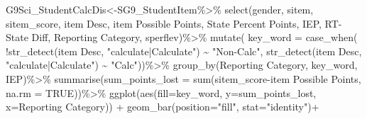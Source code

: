 \documentclass[
  letterpaper,
  DIV=11,
  numbers=noendperiod]{scrartcl}
\newenvironment{Shaded}{\begin{snugshade}}{\end{snugshade}}
\newcommand{\AttributeTok}[1]{\textcolor[rgb]{0.40,0.45,0.13}{#1}}
\newcommand{\ConstantTok}[1]{\textcolor[rgb]{0.56,0.35,0.01}{#1}}
\newcommand{\FunctionTok}[1]{\textcolor[rgb]{0.28,0.35,0.67}{#1}}
\newcommand{\NormalTok}[1]{\textcolor[rgb]{0.00,0.23,0.31}{#1}}
\newcommand{\OtherTok}[1]{\textcolor[rgb]{0.00,0.23,0.31}{#1}}
\newcommand{\SpecialCharTok}[1]{\textcolor[rgb]{0.37,0.37,0.37}{#1}}
\newcommand{\StringTok}[1]{\textcolor[rgb]{0.13,0.47,0.30}{#1}}
\begin{document}
\begin{Shaded}
\begin{Highlighting}[]
\NormalTok{G9Sci\_StudentCalcDis}\OtherTok{\textless{}{-}}\NormalTok{SG9\_StudentItem}\SpecialCharTok{\%\textgreater{}\%}
  \FunctionTok{select}\NormalTok{(gender, sitem, sitem\_score, }\StringTok{\textasciigrave{}}\AttributeTok{item Desc}\StringTok{\textasciigrave{}}\NormalTok{, }\StringTok{\textasciigrave{}}\AttributeTok{item Possible Points}\StringTok{\textasciigrave{}}\NormalTok{, }\StringTok{\textasciigrave{}}\AttributeTok{State Percent Points}\StringTok{\textasciigrave{}}\NormalTok{, IEP, }\StringTok{\textasciigrave{}}\AttributeTok{RT{-}State Diff}\StringTok{\textasciigrave{}}\NormalTok{, }\StringTok{\textasciigrave{}}\AttributeTok{Reporting Category}\StringTok{\textasciigrave{}}\NormalTok{, }\StringTok{\textasciigrave{}}\AttributeTok{sperflev}\StringTok{\textasciigrave{}}\NormalTok{)}\SpecialCharTok{\%\textgreater{}\%}
  \FunctionTok{mutate}\NormalTok{( }\AttributeTok{key\_word =} \FunctionTok{case\_when}\NormalTok{(}
     \SpecialCharTok{!}\FunctionTok{str\_detect}\NormalTok{(}\StringTok{\textasciigrave{}}\AttributeTok{item Desc}\StringTok{\textasciigrave{}}\NormalTok{, }\StringTok{"calculate|Calculate"}\NormalTok{) }\SpecialCharTok{\textasciitilde{}} \StringTok{"Non{-}Calc"}\NormalTok{,}
     \FunctionTok{str\_detect}\NormalTok{(}\StringTok{\textasciigrave{}}\AttributeTok{item Desc}\StringTok{\textasciigrave{}}\NormalTok{, }\StringTok{"calculate|Calculate"}\NormalTok{) }\SpecialCharTok{\textasciitilde{}} \StringTok{"Calc"}\NormalTok{))}\SpecialCharTok{\%\textgreater{}\%}
  \FunctionTok{group\_by}\NormalTok{(}\StringTok{\textasciigrave{}}\AttributeTok{Reporting Category}\StringTok{\textasciigrave{}}\NormalTok{, }\StringTok{\textasciigrave{}}\AttributeTok{key\_word}\StringTok{\textasciigrave{}}\NormalTok{, }\StringTok{\textasciigrave{}}\AttributeTok{IEP}\StringTok{\textasciigrave{}}\NormalTok{)}\SpecialCharTok{\%\textgreater{}\%}
  \FunctionTok{summarise}\NormalTok{(}\AttributeTok{sum\_points\_lost =} \FunctionTok{sum}\NormalTok{(}\StringTok{\textasciigrave{}}\AttributeTok{sitem\_score}\StringTok{\textasciigrave{}}\SpecialCharTok{{-}}\StringTok{\textasciigrave{}}\AttributeTok{item Possible Points}\StringTok{\textasciigrave{}}\NormalTok{, }\AttributeTok{na.rm =} \ConstantTok{TRUE}\NormalTok{))}\SpecialCharTok{\%\textgreater{}\%}
 \FunctionTok{ggplot}\NormalTok{(}\FunctionTok{aes}\NormalTok{(}\AttributeTok{fill=}\StringTok{\textasciigrave{}}\AttributeTok{key\_word}\StringTok{\textasciigrave{}}\NormalTok{, }\AttributeTok{y=}\NormalTok{sum\_points\_lost, }\AttributeTok{x=}\StringTok{\textasciigrave{}}\AttributeTok{Reporting Category}\StringTok{\textasciigrave{}}\NormalTok{)) }\SpecialCharTok{+} \FunctionTok{geom\_bar}\NormalTok{(}\AttributeTok{position=}\StringTok{"fill"}\NormalTok{, }\AttributeTok{stat=}\StringTok{"identity"}\NormalTok{)}\SpecialCharTok{+}

\end{Highlighting}
\end{Shaded}
\end{document}
